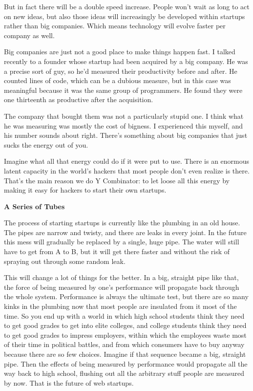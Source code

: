 \documentclass[12pt]{book}
\begin{document}
But in fact there will be a double speed increase. People won't wait as
long to act on new ideas, but also those ideas will increasingly be
developed within startups rather than big companies. Which means
technology will evolve faster per company as well.

Big companies are just not a good place to make things happen fast. I
talked recently to a founder whose startup had been acquired by a big
company. He was a precise sort of guy, so he'd measured their
productivity before and after. He counted lines of code, which can be a
dubious measure, but in this case was meaningful because it was the same
group of programmers. He found they were one thirteenth as productive
after the acquisition.

The company that bought them was not a particularly stupid one. I think
what he was measuring was mostly the cost of bigness. I experienced this
myself, and his number sounds about right. There's something about big
companies that just sucks the energy out of you.

Imagine what all that energy could do if it were put to use. There is an
enormous latent capacity in the world's hackers that most people don't
even realize is there. That's the main reason we do Y Combinator: to let
loose all this energy by making it easy for hackers to start their own
startups.

\textbf{A Series of Tubes}

The process of starting startups is currently like the plumbing in an
old house. The pipes are narrow and twisty, and there are leaks in every
joint. In the future this mess will gradually be replaced by a single,
huge pipe. The water will still have to get from A to B, but it will get
there faster and without the risk of spraying out through some random
leak.

This will change a lot of things for the better. In a big, straight pipe
like that, the force of being measured by one's performance will
propagate back through the whole system. Performance is always the
ultimate test, but there are so many kinks in the plumbing now that most
people are insulated from it most of the time. So you end up with a
world in which high school students think they need to get good grades
to get into elite colleges, and college students think they need to get
good grades to impress employers, within which the employees waste most
of their time in political battles, and from which consumers have to buy
anyway because there are so few choices. Imagine if that sequence became
a big, straight pipe. Then the effects of being measured by performance
would propagate all the way back to high school, flushing out all the
arbitrary stuff people are measured by now. That is the future of web
startups.
\end{document}
